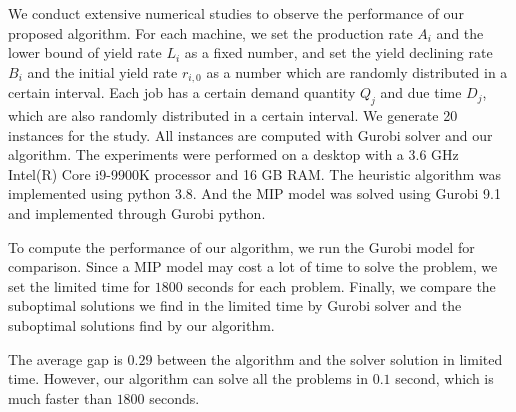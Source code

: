 \documentclass[12pt,a4page]{article}
\theoremstyle{definition}
\theoremstyle{remark}
\begin{document}
We conduct extensive numerical studies to observe the performance of our proposed algorithm. For each machine, we set the production rate $A_i$ and the lower bound of yield rate $L_i$ as a fixed number, and set the yield declining rate $B_i$ and the initial yield rate $r_{i,0}$ as a number which are randomly distributed in a certain interval. Each job has a certain demand quantity $Q_j$ and due time $D_j$, which are also randomly distributed in a certain interval. We generate 20 instances for the study. All instances are computed with Gurobi solver and our algorithm. The experiments were performed on a desktop with a 3.6 GHz Intel(R) Core i9-9900K processor and 16 GB RAM. The heuristic algorithm was implemented using python 3.8. And the MIP model was solved using Gurobi 9.1 and implemented through Gurobi python.

To compute the performance of our algorithm, we run the Gurobi model for comparison. Since a MIP model may cost a lot of time to solve the problem, we set the limited time for $1800$ seconds for each problem. Finally, we compare the suboptimal solutions we find in the limited time by Gurobi solver and the suboptimal solutions find by our algorithm.

The average gap is $0.29$ between the algorithm and the solver solution in limited time. However, our algorithm can solve all the problems in $0.1$ second, which is much faster than $1800$ seconds.







\end{document}
